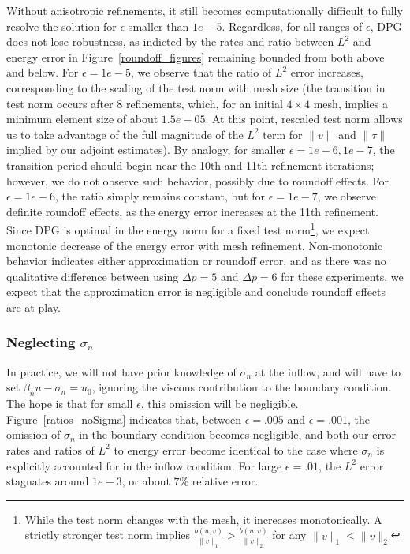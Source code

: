 \documentclass[11pt,onecolumn]{scrartcl}
\begin{document}
Without anisotropic refinements, it still becomes computationally difficult to fully resolve the solution for $\epsilon$ smaller than $1e-5$. Regardless, for all ranges of $\epsilon$, DPG does not lose robustness, as indicted by the rates and ratio between $L^2$ and energy error in Figure~\ref{roundoff_figures} remaining bounded from both above and below. For $\epsilon = 1e-5$, we observe that the ratio of $L^2$ error increases, corresponding to the scaling of the test norm with mesh size (the transition in test norm occurs after 8 refinements, which, for an initial $4\times 4$ mesh, implies a minimum element size of about $1.5e-05$. At this point, rescaled test norm allows us to take advantage of the full magnitude of the $L^2$ term for $\|v\|$ and $\|\tau\|$ implied by our adjoint estimates). By analogy, for smaller $\epsilon = 1e-6, 1e-7$, the transition period should begin near the 10th and 11th refinement iterations; however, we do not observe such behavior, possibly due to roundoff effects.
For $\epsilon=1e-6$, the ratio simply remains constant, but for $\epsilon=1e-7$, we observe definite roundoff effects, as the energy error increases at the 11th refinement. Since DPG is optimal in the energy norm for a fixed test norm\footnote{While the test norm changes with the mesh, it increases monotonically. A strictly stronger test norm implies $\frac{b(u,v)}{\|v\|_1} \geq \frac{b(u,v)}{\|v\|_2}$ for any $\|v\|_1 \leq \|v\|_2$}, we expect monotonic decrease of the energy error with mesh refinement. Non-monotonic behavior indicates either approximation or roundoff error, and as there was no qualitative difference between using $\Delta p = 5$ and $\Delta p = 6$ for these experiments, we expect that the approximation error is negligible and conclude roundoff effects are at play. 

\subsubsection{Neglecting $\sigma_n$}

In practice, we will not have prior knowledge of $\sigma_n$ at the inflow, and will have to set $\beta_n u - \sigma_n = u_0$, ignoring the viscous contribution to the boundary condition.  The hope is that for small $\epsilon$, this omission will be negligible. Figure~\ref{ratios_noSigma} indicates that, between $\epsilon = .005$ and $\epsilon = .001$, the omission of $\sigma_n$ in the boundary condition becomes negligible, and both our error rates and ratios of $L^2$ to energy error become identical to the case where $\sigma_n$ is explicitly accounted for in the inflow condition. For large $\epsilon = .01$, the $L^2$ error stagnates around $1e-3$, or about $7\%$ relative error. 
\end{document}
